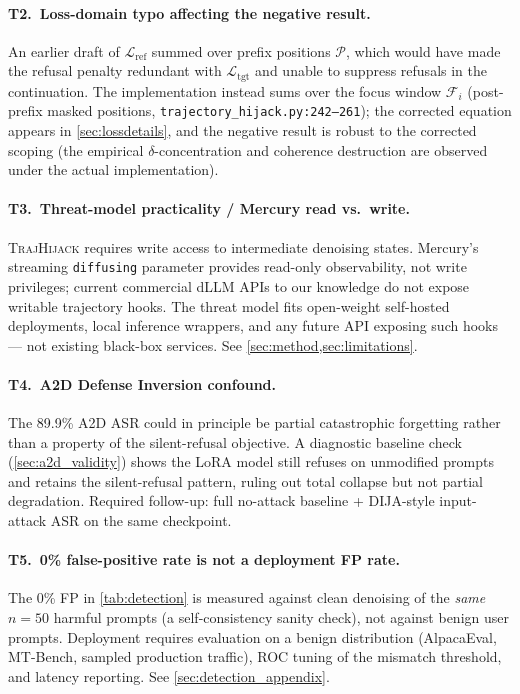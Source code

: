 \documentclass{article}
\theoremstyle{coloredthm}
\newcommand{\method}{\textsc{TrajHijack}}
\newcommand{\dllm}{dLLM}
\begin{document}
\paragraph{T2.\ Loss-domain typo affecting the negative result.} An earlier draft of $\mathcal{L}_{\text{ref}}$ summed over prefix positions $\mathcal{P}$, which would have made the refusal penalty redundant with $\mathcal{L}_{\text{tgt}}$ and unable to suppress refusals in the continuation. The implementation instead sums over the focus window $\mathcal{F}_i$ (post-prefix masked positions, \texttt{trajectory\_hijack.py:242--261}); the corrected equation appears in \cref{sec:lossdetails}, and the negative result is robust to the corrected scoping (the empirical $\delta$-concentration and coherence destruction are observed under the actual implementation).

\paragraph{T3.\ Threat-model practicality / Mercury read vs.\ write.} \method{} requires write access to intermediate denoising states. Mercury's streaming \texttt{diffusing} parameter provides read-only observability, not write privileges; current commercial \dllm{} APIs to our knowledge do not expose writable trajectory hooks. The threat model fits open-weight self-hosted deployments, local inference wrappers, and any future API exposing such hooks --- not existing black-box services. See \cref{sec:method,sec:limitations}.

\paragraph{T4.\ A2D Defense Inversion confound.} The 89.9\% A2D ASR could in principle be partial catastrophic forgetting rather than a property of the silent-refusal objective. A diagnostic baseline check (\cref{sec:a2d_validity}) shows the LoRA model still refuses on unmodified prompts and retains the silent-refusal pattern, ruling out total collapse but not partial degradation. Required follow-up: full no-attack baseline + DIJA-style input-attack ASR on the same checkpoint.

\paragraph{T5.\ 0\% false-positive rate is not a deployment FP rate.} The 0\% FP in \cref{tab:detection} is measured against clean denoising of the \emph{same} $n{=}50$ harmful prompts (a self-consistency sanity check), not against benign user prompts. Deployment requires evaluation on a benign distribution (AlpacaEval, MT-Bench, sampled production traffic), ROC tuning of the mismatch threshold, and latency reporting. See \cref{sec:detection_appendix}.
\end{document}
